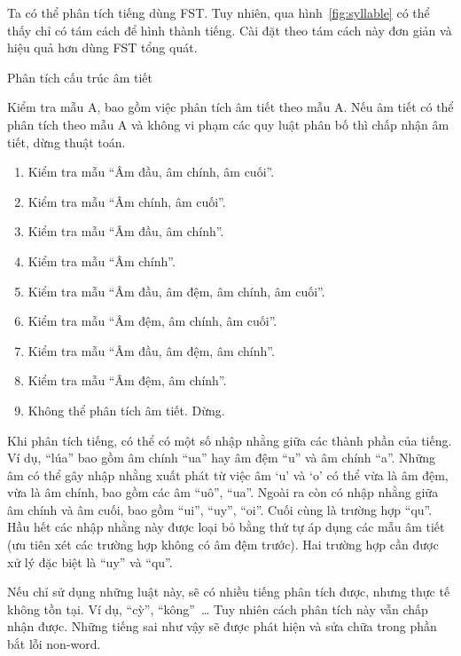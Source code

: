 \documentclass[a4paper,oneside,14pt]{extbook} %
\begin{document}
Ta có thể phân tích tiếng dùng FST. Tuy nhiên, qua
 hình~\ref{fig:syllable} có thể thấy chỉ có tám cách để hình thành
tiếng. Cài đặt theo tám cách này đơn giản và hiệu quả hơn dùng FST
tổng quát. 
\begin{algo}\caption{Phân tích cấu trúc âm tiết}
  Kiểm tra mẫu A, bao gồm việc phân tích âm tiết theo mẫu A. Nếu âm
  tiết có thể phân tích theo mẫu A và không vi phạm các quy luật phân
  bố thì chấp nhận âm tiết, dừng thuật toán.
  \begin{enumerate}
  \item Kiểm tra mẫu ``Âm đầu, âm chính, âm cuối''.
  \item Kiểm tra mẫu ``Âm chính, âm cuối''. 
  \item Kiểm tra mẫu ``Âm đầu, âm chính''. 
  \item Kiểm tra mẫu ``Âm chính''. 
  \item Kiểm tra mẫu ``Âm đầu, âm đệm, âm chính, âm cuối''. 
  \item Kiểm tra mẫu ``Âm đệm, âm chính, âm cuối''. 
  \item Kiểm tra mẫu ``Âm đầu, âm đệm, âm chính''. 
  \item Kiểm tra mẫu ``Âm đệm, âm chính''. 
  \item Không thể phân tích âm tiết. Dừng.
  \end{enumerate}
\end{algo}

Khi phân tích tiếng, có thể có một số nhập nhằng giữa các thành phần
của tiếng. Ví dụ, ``lúa'' bao gồm âm chính ``ua'' hay âm đệm ``u'' và âm
chính ``a''. Những âm có thể gây nhập nhằng xuất phát từ việc âm `u'
và `o' có thể vừa là âm đệm, vừa là âm chính, bao gồm các âm ``uô'',
``ua''. Ngoài ra còn có nhập nhằng giữa âm chính và âm cuối, bao gồm
``ui'', ``uy'', ``oi''. Cuối cùng là trường hợp ``qu''. Hầu hết các
nhập nhằng này được loại bỏ bằng thứ tự áp dụng các mẫu âm tiết (ưu
tiên xét các trường hợp không có âm đệm trước). Hai
trường hợp cần được xử lý đặc biệt là ``uy'' và ``qu''.

Nếu chỉ sử dụng những luật này, sẽ có nhiều tiếng phân tích được,
nhưng thực tế không tồn tại. Ví dụ, ``cỳ'', ``kông''~\ldots{} Tuy
nhiên cách phân tích này vẫn chấp nhận được. Những tiếng sai như vậy
sẽ được phát hiện và sửa chữa trong phần bắt lỗi non-word. 
\end{document}

